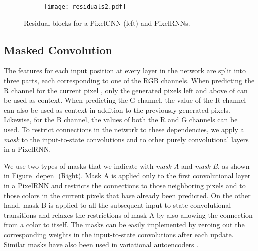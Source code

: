 \documentclass{article}
\begin{document}
\begin{figure}[ht]
\centering
\begin{subfigure}{.4\textwidth}
  \centering
  \texttt{[image: residuals2.pdf]}
\end{subfigure}\caption{Residual blocks for a PixelCNN (left) and PixelRNNs.}
\label{fig:residual_blocks}
\vspace{-0.2cm}
\end{figure}

\subsection{Masked Convolution}
\label{sect:masked}

The  features for each input position at every layer in the network are split into three parts, each corresponding to one of the RGB channels. When predicting the R channel for the current pixel , only the generated pixels left and above of  can be used as context. When predicting the G channel, the value of the R channel can also be used as context in addition to the previously generated pixels. Likewise, for the B channel, the values of both the R and G channels can be used. To restrict connections in the network to these dependencies, we apply a \emph{mask} to the input-to-state convolutions and to other purely convolutional layers in a PixelRNN. 

We use two types of masks that we indicate with \emph{mask A} and \emph{mask B}, as shown in Figure \ref{depen} (Right). Mask A is applied only to the first convolutional layer in a PixelRNN and restricts the connections to those neighboring pixels and to those colors in the current pixels that have already been predicted. On the other hand, mask B is applied to all the subsequent input-to-state convolutional transitions and relaxes the restrictions of mask A by also allowing the connection from a color to itself. The masks can be easily implemented by zeroing out the corresponding weights in the input-to-state convolutions after each update. Similar masks have also been used in variational autoencoders \cite{gregor2013deep, germain2015made}.
\end{document}
